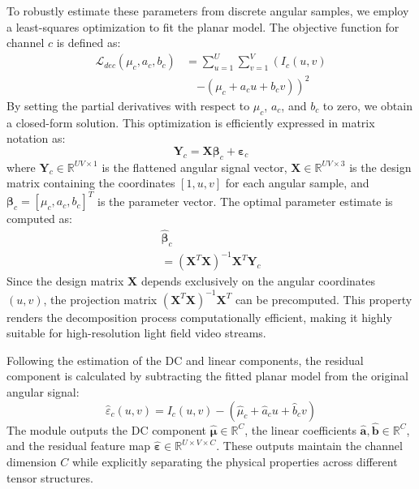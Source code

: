 \documentclass[lettersize,journal]{IEEEtran}
\begin{document}
To robustly estimate these parameters from discrete angular samples, we employ a least-squares optimization to fit the planar model. The objective function for channel $c$ is defined as:
\begin{equation}
\begin{aligned}
\mathcal{L}_{dec}(\mu_c, a_c, b_c) &= \sum_{u=1}^{U} \sum_{v=1}^{V} \left( I_c(u,v) \right. \\
&\quad \left. - (\mu_c + a_c u + b_c v) \right)^2
\end{aligned}
\end{equation}
By setting the partial derivatives with respect to $\mu_c$, $a_c$, and $b_c$ to zero, we obtain a closed-form solution. This optimization is efficiently expressed in matrix notation as:
\begin{equation}
\mathbf{Y}_c = \mathbf{X} \boldsymbol{\beta}_c + \boldsymbol{\varepsilon}_c
\end{equation}
where $\mathbf{Y}_c \in \mathbb{R}^{UV \times 1}$ is the flattened angular signal vector, $\mathbf{X} \in \mathbb{R}^{UV \times 3}$ is the design matrix containing the coordinates $[1, u, v]$ for each angular sample, and $\boldsymbol{\beta}_c = [\mu_c, a_c, b_c]^T$ is the parameter vector. The optimal parameter estimate is computed as:
\begin{multline}

\hat{\boldsymbol{\beta}}_c \\
= (\mathbf{X}^T \mathbf{X})^{-1} \mathbf{X}^T \mathbf{Y}_c
\end{multline}
Since the design matrix $\mathbf{X}$ depends exclusively on the angular coordinates $(u,v)$, the projection matrix $(\mathbf{X}^T \mathbf{X})^{-1} \mathbf{X}^T$ can be precomputed. This property renders the decomposition process computationally efficient, making it highly suitable for high-resolution light field video streams.

Following the estimation of the DC and linear components, the residual component is calculated by subtracting the fitted planar model from the original angular signal:
\begin{equation}
\hat{\varepsilon}_c(u,v) = I_c(u,v) - (\hat{\mu}_c + \hat{a}_c u + \hat{b}_c v)
\end{equation}
The module outputs the DC component $\hat{\boldsymbol{\mu}} \in \mathbb{R}^{C}$, the linear coefficients $\hat{\mathbf{a}}, \hat{\mathbf{b}} \in \mathbb{R}^{C}$, and the residual feature map $\hat{\boldsymbol{\varepsilon}} \in \mathbb{R}^{U \times V \times C}$. These outputs maintain the channel dimension $C$ while explicitly separating the physical properties across different tensor structures.
\end{document}
